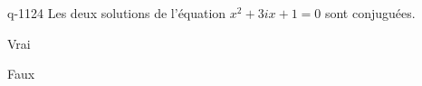 \begin{truefalse}{q-1124}
Les deux solutions de l'équation $x^2 + 3ix + 1 = 0$ sont conjuguées.
\item Vrai
\item* Faux
\end{truefalse}

